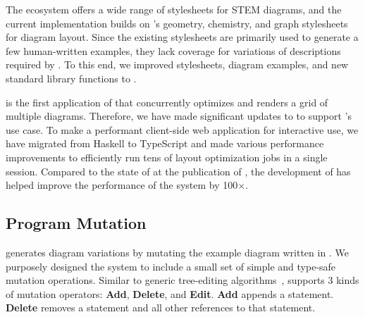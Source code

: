 The \Penrose ecosystem offers a wide range of stylesheets for STEM diagrams, and the current \Edgeworth implementation builds on \Penrose's geometry, chemistry, and graph stylesheets for diagram layout. Since the existing \Penrose stylesheets are primarily used to generate a few human-written examples, they lack coverage for variations of \Substance descriptions required by \Edgeworth. To this end, we improved stylesheets, diagram examples, and new standard library functions to \Penrose.

\Edgeworth is the first application of \Penrose that concurrently optimizes and renders a grid of multiple diagrams. Therefore, we have made significant updates to \Penrose to support \Edgeworth's use case. To make \Edgeworth a performant client-side web application for interactive use, we have migrated from Haskell to TypeScript and made various performance improvements to efficiently run tens of layout optimization jobs in a single session. Compared to the state of \Penrose at the publication of \citet{penrose}, the development of \Edgeworth has helped improve the performance of the system by 100$\times$.


\subsection{Program Mutation}
\label{sec:edgeworth-mutation}

\Edgeworth generates diagram variations by mutating the example diagram written in \Substance. 
We purposely designed the system to include a small set of simple and type-safe mutation operations. Similar to generic tree-editing algorithms~\cite{gumtree}, \Edgeworth supports 3 kinds of mutation operators: \textbf{Add}, \textbf{Delete}, and \textbf{Edit}. \textbf{Add} appends a statement. \textbf{Delete} removes a statement and all other references to that statement. 

